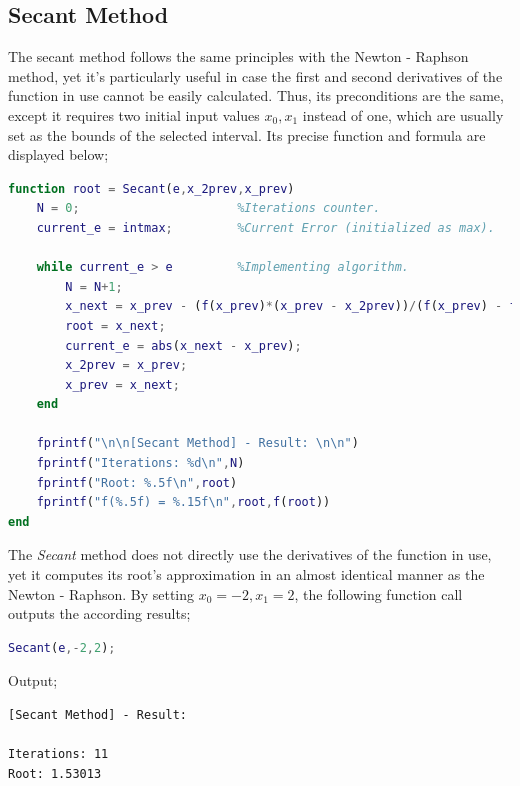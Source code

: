 \documentclass{article}
\begin{document}
\subsection{Secant Method}
The secant method follows the same principles with the Newton - Raphson method, yet it's particularly useful in case the first and second derivatives of the function in use cannot be easily calculated. Thus, its preconditions are the same, except it requires two initial input values $x_0, x_1$ instead of one, which are usually set as the bounds of the selected interval. Its precise function and formula are displayed below;
\begin{lstlisting}[language=Matlab]
function root = Secant(e,x_2prev,x_prev)           
    N = 0;                      %Iterations counter.
    current_e = intmax;         %Current Error (initialized as max).

    while current_e > e         %Implementing algorithm.
        N = N+1;                                                                    
        x_next = x_prev - (f(x_prev)*(x_prev - x_2prev))/(f(x_prev) - f(x_2prev));  
        root = x_next;                                                              
        current_e = abs(x_next - x_prev);                                           
        x_2prev = x_prev;
        x_prev = x_next;                                                            
    end    

    fprintf("\n\n[Secant Method] - Result: \n\n")   
    fprintf("Iterations: %d\n",N)                
    fprintf("Root: %.5f\n",root) 
    fprintf("f(%.5f) = %.15f\n",root,f(root)) 
end
\end{lstlisting}
The \emph{Secant} method does not directly use the derivatives of the function in use, yet it computes its root's approximation in an almost identical manner as the Newton - Raphson. By setting $x_0=-2, x_1=2$, the following function call outputs the according results;
\begin{lstlisting}[language=Matlab]
Secant(e,-2,2);
\end{lstlisting}
Output;
\begin{lstlisting}
[Secant Method] - Result: 

Iterations: 11
Root: 1.53013
\end{lstlisting}
\pagebreak
\end{document}
